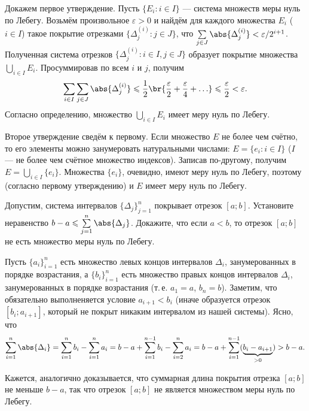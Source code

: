 \begin{solution}
    Докажем первое утверждение. Пусть $\{E_i : i \in I\}$ --- система множеств меры нуль по Лебегу. Возьмём произвольное $\varepsilon > 0$ и найдём для каждого множества $E_i$ ($i \in I$) такое покрытие отрезками $\{\Delta^{(i)}_j : j \in J\}$, что $\sum\limits_{j \in J}\abs{\Delta^{(i)}_j} < \varepsilon / 2^{i + 1}$. Полученная система отрезков $\{\Delta^{(i)}_j : i \in I, j \in J\}$ образует покрытие множества $\bigcup\limits_{i \in I}E_i$. Просуммировав по всем $i$ и $j$, получим
    \[
        \sum_{i \in I}\sum_{j \in J}\abs{\Delta^{(i)}_j} \leqslant \frac{1}{2}\br{\frac{\varepsilon}{2} + \frac{\varepsilon}{4} + \ldots} \leqslant \frac{\varepsilon}{2} < \varepsilon.
    \]
    Согласно определению, множество $\bigcup\limits_{i \in I}E_i$ имеет меру нуль по Лебегу.

    Второе утверждение сведём к первому. Если множество $E$ не более чем счётно, то его элементы можно занумеровать натуральными числами: $E = \{e_i : i \in I\}$ ($I$ --- не более чем счётное множество индексов). Записав по-другому, получим $E = \bigcup\limits_{i \in I}\{e_i\}$. Множества $\{e_i\}$, очевидно, имеют меру нуль по Лебегу, поэтому (согласно первому утверждению) и $E$ имеет меру нуль по Лебегу.
\end{solution}

\begin{problem}[5]
    Допустим, система интервалов $\{\Delta_j\}_{j = 1}^n$ покрывает отрезок $[a; b]$. Установите неравенство $b - a \leqslant \sum\limits_{j = 1}^n\abs{\Delta_j}$. Докажите, что если $a < b$, то отрезок $[a; b]$ не есть множество меры нуль по Лебегу.
\end{problem}

\begin{solution}
    Пусть $\{a_i\}_{i = 1}^n$ есть множество левых концов интервалов $\Delta_i$, занумерованных в порядке возрастания, а $\{b_i\}_{i = 1}^n$ есть множество правых концов интервалов $\Delta_i$, занумерованных в порядке возрастания (т.\,е. $a_1 = a$, $b_n = b$). Заметим, что обязательно выполненяется условие $a_{i + 1} < b_i$ (иначе образуется отрезок $[b_i; a_{i + 1}]$, который не покрыт никаким интервалом из нашей системы). Ясно, что
    \[
        \sum_{i = 1}^n\abs{\Delta_i} = \sum_{i = 1}^nb_i - \sum_{i = 1}^na_i = b - a + \sum_{i = 1}^{n - 1}b_i - \sum_{i = 2}^na_i = b - a + \sum_{i = 1}^{n - 1}(\underbrace{b_i - a_{i + 1}}_{> 0}) > b - a.
    \]

    Кажется, аналогично доказывается, что суммарная длина покрытия отрезка $[a; b]$ не меньше $b - a$, так что отрезок $[a; b]$ не является множеством меры нуль по Лебегу.
\end{solution}

